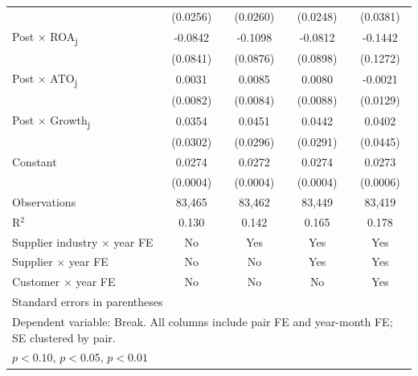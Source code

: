 {\begin{tabular}{l*{4}{c}}
            &    (0.0256)         &    (0.0260)         &    (0.0248)         &    (0.0381)         \\
\addlinespace
Post \(\times\) ROA\textsubscript{j}&     -0.0842         &     -0.1098         &     -0.0812         &     -0.1442         \\
            &    (0.0841)         &    (0.0876)         &    (0.0898)         &    (0.1272)         \\
\addlinespace
Post \(\times\) ATO\textsubscript{j}&      0.0031         &      0.0085         &      0.0080         &     -0.0021         \\
            &    (0.0082)         &    (0.0084)         &    (0.0088)         &    (0.0129)         \\
\addlinespace
Post \(\times\) Growth\textsubscript{j}&      0.0354         &      0.0451         &      0.0442         &      0.0402         \\
            &    (0.0302)         &    (0.0296)         &    (0.0291)         &    (0.0445)         \\
\addlinespace
Constant    &      0.0274\sym{***}&      0.0272\sym{***}&      0.0274\sym{***}&      0.0273\sym{***}\\
            &    (0.0004)         &    (0.0004)         &    (0.0004)         &    (0.0006)         \\
\midrule
Observations&      83,465         &      83,462         &      83,449         &      83,419         \\
R\(^2\)     &       0.130         &       0.142         &       0.165         &       0.178         \\
Supplier industry \(\times\) year FE&          No         &         Yes         &         Yes         &         Yes         \\
Supplier \(\times\) year FE&          No         &          No         &         Yes         &         Yes         \\
Customer \(\times\) year FE&          No         &          No         &          No         &         Yes         \\
\bottomrule
\multicolumn{5}{l}{\footnotesize Standard errors in parentheses}\\
\multicolumn{5}{l}{\footnotesize Dependent variable: Break. All columns include pair FE and year-month FE; SE clustered by pair.}\\
\multicolumn{5}{l}{\footnotesize \sym{*} \(p<0.10\), \sym{**} \(p<0.05\), \sym{***} \(p<0.01\)}\\
\end{tabular}
}
